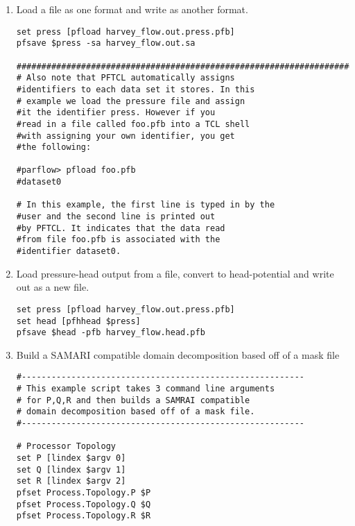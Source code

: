 \begin{enumerate}

\item Load a file as one format and write as another format.
\begin{display}\begin{verbatim}
set press [pfload harvey_flow.out.press.pfb]
pfsave $press -sa harvey_flow.out.sa

#####################################################################
# Also note that PFTCL automatically assigns
#identifiers to each data set it stores. In this
# example we load the pressure file and assign
#it the identifier press. However if you
#read in a file called foo.pfb into a TCL shell
#with assigning your own identifier, you get
#the following:

#parflow> pfload foo.pfb
#dataset0

# In this example, the first line is typed in by the
#user and the second line is printed out
#by PFTCL. It indicates that the data read
#from file foo.pfb is associated with the
#identifier dataset0.

\end{verbatim}\end{display}


\item Load pressure-head output from a file, convert to head-potential and write out as a new file.

\begin{display}\begin{verbatim}
set press [pfload harvey_flow.out.press.pfb]
set head [pfhhead $press]
pfsave $head -pfb harvey_flow.head.pfb

\end{verbatim}\end{display}



\item Build a SAMARI compatible domain decomposition based off of a mask file
\begin{display}\begin{verbatim}
#---------------------------------------------------------
# This example script takes 3 command line arguments
# for P,Q,R and then builds a SAMRAI compatible
# domain decomposition based off of a mask file.
#---------------------------------------------------------

# Processor Topology
set P [lindex $argv 0]
set Q [lindex $argv 1]
set R [lindex $argv 2]
pfset Process.Topology.P $P
pfset Process.Topology.Q $Q
pfset Process.Topology.R $R


\end{verbatim}
\end{display}
\end{enumerate}
